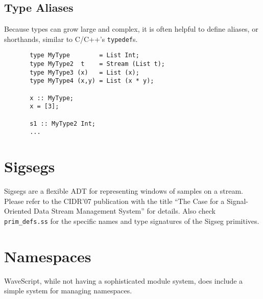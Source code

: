 \documentclass[twocolumn]{report}
\begin{document}
\subsection{Type Aliases}

Because types can grow large and complex, it is often helpful to
define aliases, or shorthands, similar to C/C++'s {\tt typedef}s.

\begin{center}
\begin{verbatim}
       type MyType        = List Int;
       type MyType2  t    = Stream (List t);
       type MyType3 (x)   = List (x);
       type MyType4 (x,y) = List (x * y);

       x :: MyType;
       x = [3];

       s1 :: MyType2 Int;
       ...
\end{verbatim}
\end{center}


\section{Sigsegs}

Sigsegs are a flexible ADT for representing windows of samples on a stream.
Please refer to the CIDR'07 publication with the title
``The Case for a Signal-Oriented Data Stream Management System'' for
details.  Also check {\tt prim\_defs.ss} for the specific names and
type signatures of the Sigseg primitives.






  






\section{Namespaces}

WaveScript, while not having a sophisticated module system, does
include a simple system for managing namespaces.
\end{document}

